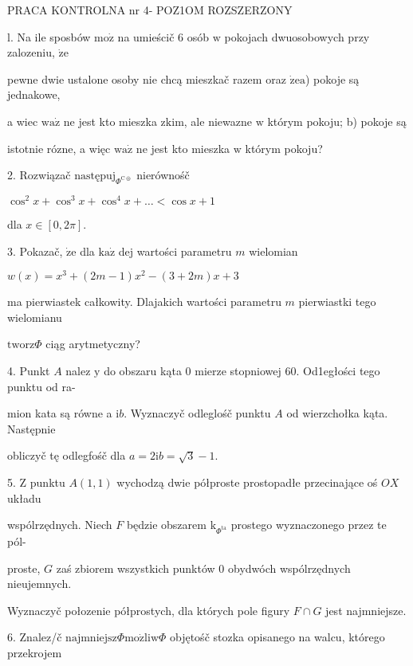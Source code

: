 \documentclass[a4paper,12pt]{article}
\begin{document}
PRACA KONTROLNA nr 4- POZ1OM ROZSZERZONY

l. Na ile sposbów $\mathrm{m}\mathrm{o}\dot{\mathrm{z}}$ na umieścič 6 osób $\mathrm{w}$ pokojach dwuosobowych przy zalozeniu, $\dot{\mathrm{z}}\mathrm{e}$

pewne dwie ustalone osoby nie chcą mieszkač razem oraz $\dot{\mathrm{z}}\mathrm{e} \mathrm{a}$) pokoje są jednakowe,

a wiec $\mathrm{w}\mathrm{a}\dot{\mathrm{z}}$ ne jest kto mieszka $\mathrm{z} \mathrm{k}\mathrm{i}\mathrm{m}$, ale niewazne $\mathrm{w}$ którym pokoju; b) pokoje są

istotnie rózne, a więc $\mathrm{w}\mathrm{a}\dot{\mathrm{z}}$ ne jest kto mieszka $\mathrm{w}$ którym pokoju?

2. Rozwiązač $\mathrm{n}\mathrm{a}\mathrm{s}\mathrm{t}\text{ę} \mathrm{p}\mathrm{u}\mathrm{j}_{\Phi^{\mathrm{C}\oplus}}$ nierównośč

$\cos^{2}x+\cos^{3}x+\cos^{4}x+\ldots<\cos x+1$

dla $x\in[0,2\pi].$

3. Pokazač, $\dot{\mathrm{z}}\mathrm{e}$ dla $\mathrm{k}\mathrm{a}\dot{\mathrm{z}}$ dej wartości parametru $m$ wielomian

$w(x)=x^{3}+(2m-1)x^{2}-(3+2m)x+3$

ma pierwiastek całkowity. Dlajakich wartości parametru $m$ pierwiastki tego wielomianu

$\mathrm{t}\mathrm{w}\mathrm{o}\mathrm{r}\mathrm{z}\Phi$ ciąg arytmetyczny?

4. Punkt $A$ nalez $\mathrm{y}$ do obszaru kąta $0$ mierze stopniowej 60. Od1egłości tego punktu od ra-

mion kata są równe a $\mathrm{i}b$. Wyznaczyč odleglośč punktu $A$ od wierzchołka kąta. Następnie

obliczyč tę odlegfośč dla $a=2\mathrm{i}b=\sqrt{3}-1.$

5. $\mathrm{Z}$ punktu $A(1,1)$ wychodzą dwie półproste prostopadłe przecinające oś $OX$ układu

wspólrzędnych. Niech $F$ będzie obszarem $\mathrm{k}_{\Phi^{\mathrm{t}\mathrm{a}}}$ prostego wyznaczonego przez te pól-

proste, $G$ zaś zbiorem wszystkich punktów $0$ obydwóch wspólrzędnych nieujemnych.

Wyznaczyč połozenie półprostych, dla których pole figury $F\cap G$ jest najmniejsze.

6. Znalez/č $\mathrm{n}\mathrm{a}\mathrm{j}\mathrm{m}\mathrm{n}\mathrm{i}\mathrm{e}\mathrm{j}\mathrm{s}\mathrm{z}\Phi \mathrm{m}\mathrm{o}\dot{\mathrm{z}}\mathrm{l}\mathrm{i}\mathrm{w}\Phi$ objętośč stozka opisanego na walcu, którego przekrojem
\end{document}
